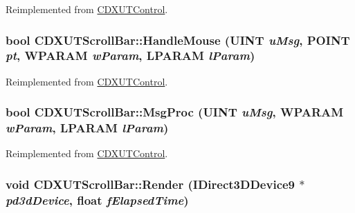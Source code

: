 Reimplemented from \hyperlink{class_c_d_x_u_t_control_a94044e608adeac7c329d83cf63587dcf}{CDXUTControl}.\hypertarget{class_c_d_x_u_t_scroll_bar_aa0c2286530836c1ed431dea5760280da}{
\subsubsection[{HandleMouse}]{\setlength{\rightskip}{0pt plus 5cm}bool CDXUTScrollBar::HandleMouse (UINT {\em uMsg}, \/  POINT {\em pt}, \/  WPARAM {\em wParam}, \/  LPARAM {\em lParam})}}
\label{class_c_d_x_u_t_scroll_bar_aa0c2286530836c1ed431dea5760280da}


Reimplemented from \hyperlink{class_c_d_x_u_t_control_a263979b3221cb7a44b4caea72366c335}{CDXUTControl}.\hypertarget{class_c_d_x_u_t_scroll_bar_a8c4363b3a1415d06e22906e706e1ff76}{
\subsubsection[{MsgProc}]{\setlength{\rightskip}{0pt plus 5cm}bool CDXUTScrollBar::MsgProc (UINT {\em uMsg}, \/  WPARAM {\em wParam}, \/  LPARAM {\em lParam})}}
\label{class_c_d_x_u_t_scroll_bar_a8c4363b3a1415d06e22906e706e1ff76}


Reimplemented from \hyperlink{class_c_d_x_u_t_control_a58d0d118146c8853a7ccd27da9e3fcf3}{CDXUTControl}.\hypertarget{class_c_d_x_u_t_scroll_bar_a57f6ed8cfcb605406dc8500e8ff86538}{
\subsubsection[{Render}]{\setlength{\rightskip}{0pt plus 5cm}void CDXUTScrollBar::Render (IDirect3DDevice9 $\ast$ {\em pd3dDevice}, \/  float {\em fElapsedTime})}}
\label{class_c_d_x_u_t_scroll_bar_a57f6ed8cfcb605406dc8500e8ff86538}


